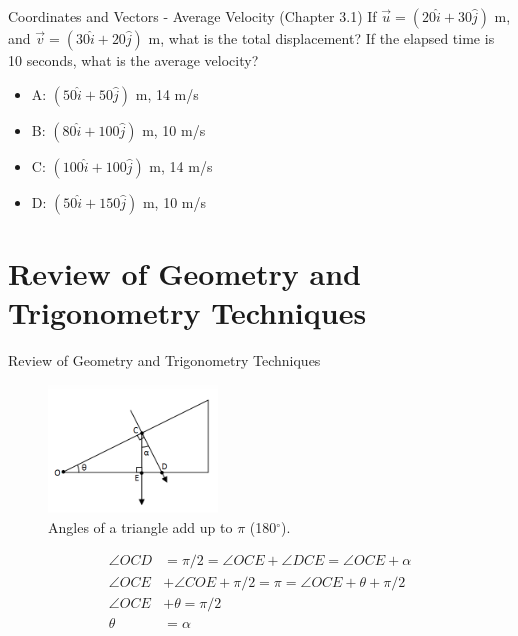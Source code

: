 \documentclass{beamer}
\begin{document}
\begin{frame}{Coordinates and Vectors - Average Velocity (Chapter 3.1)}
If $\vec{u} = (20\hat{i}+30\hat{j})$ m, and $\vec{v} = (30\hat{i}+20\hat{j})$ m, what is the total displacement?  If the elapsed time is 10 seconds, what is the average velocity? \\
\vspace{0.2cm}
\begin{itemize}
\item A: $(50\hat{i} + 50\hat{j})$ m, 14 m/s
\item B: $(80\hat{i} + 100\hat{j})$ m, 10 m/s
\item C: $(100\hat{i} + 100\hat{j})$ m, 14 m/s
\item D: $(50\hat{i} + 150\hat{j})$ m, 10 m/s
\end{itemize}
\end{frame}

\section{Review of Geometry and Trigonometry Techniques}

\begin{frame}{Review of Geometry and Trigonometry Techniques}
\small
\begin{figure}
\centering
\includegraphics[width=0.4\textwidth]{figures/incline.png}
\caption{\label{fig:incline} Angles of a triangle add up to $\pi$ (180$^{\circ}$).}
\end{figure}
\begin{align}
\angle OCD &= \pi/2 = \angle OCE + \angle DCE = \angle OCE + \alpha \\
\angle OCE & + \angle COE + \pi/2 = \pi = \angle OCE + \theta + \pi/2 \\
\angle OCE &+ \theta = \pi/2 \\
\theta &= \alpha
\end{align}
\end{frame}
\end{document}
